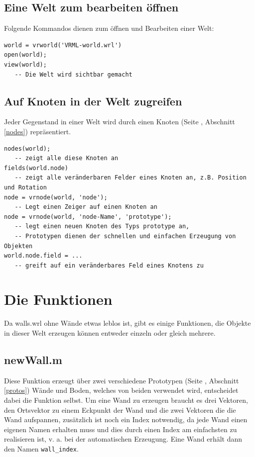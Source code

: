 \documentclass[titlepage, a4paper, ngerman]{article}
\begin{document}
\subsection{Eine Welt zum bearbeiten öffnen}
Folgende Kommandos dienen zum öffnen und Bearbeiten einer Welt:
\begin{verbatim}
world = vrworld('VRML-world.wrl')
open(world);
view(world);
   -- Die Welt wird sichtbar gemacht
\end{verbatim}

\subsection{Auf Knoten in der Welt zugreifen}
Jeder Gegenstand in einer Welt wird durch einen Knoten (Seite \pageref{nodes}, Abschnitt \ref{nodes}) repräsentiert.
\begin{verbatim}
nodes(world); 
   -- zeigt alle diese Knoten an
fields(world.node) 
   -- zeigt alle veränderbaren Felder eines Knoten an, z.B. Position und Rotation
node = vrnode(world, 'node'); 	
   -- Legt einen Zeiger auf einen Knoten an
node = vrnode(world, 'node-Name', 'prototype');	
   -- legt einen neuen Knoten des Typs prototype an,
   -- Prototypen dienen der schnellen und einfachen Erzeugung von Objekten
world.node.field = ... 
   -- greift auf ein veränderbares Feld eines Knotens zu

\end{verbatim}

\section{Die Funktionen}
Da walls.wrl ohne Wände etwas leblos ist, gibt es einige Funktionen, die Objekte in dieser Welt erzeugen können entweder einzeln oder gleich mehrere.

\subsection{newWall.m}
Diese Funktion erzeugt über zwei verschiedene Prototypen (Seite \pageref{protos}, Abschnitt \ref{protos}) Wände und Boden, welches von beiden verwendet wird, entscheidet dabei die Funktion selbst. Um eine Wand zu erzeugen braucht es drei Vektoren, den Ortsvektor zu einem Eckpunkt der Wand und die zwei Vektoren die die Wand aufspannen, zusätzlich ist noch ein Index notwendig, da jede Wand einen eigenen Namen erhalten muss und dies durch einen Index am einfachsten zu realisieren ist, v. a. bei der automatischen Erzeugung.
Eine Wand erhält dann den Namen \verb|wall_index|.
\end{document}
